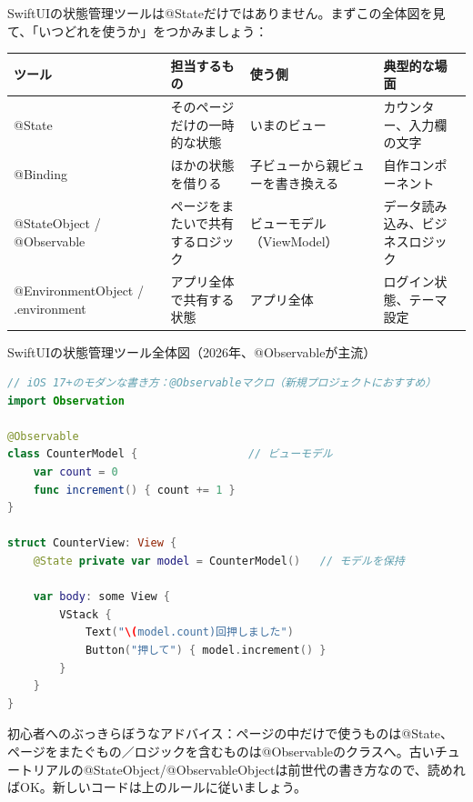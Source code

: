


SwiftUIの状態管理ツールは@Stateだけではありません。まずこの全体図を見て、「いつどれを使うか」をつかみましょう：

\begin{center}
\begin{tabularx}{\linewidth}{|X|X|X|X|}
\hline
\textbf{ツール} & \textbf{担当するもの} & \textbf{使う側} & \textbf{典型的な場面} \tabularnewline
\hline
@State & そのページだけの一時的な状態 & いまのビュー & カウンター、入力欄の文字 \tabularnewline
@Binding & ほかの状態を借りる & 子ビューから親ビューを書き換える & 自作コンポーネント \tabularnewline
@StateObject / @Observable & ページをまたいで共有するロジック & ビューモデル（ViewModel） & データ読み込み、ビジネスロジック \tabularnewline
@EnvironmentObject / .environment & アプリ全体で共有する状態 & アプリ全体 & ログイン状態、テーマ設定 \tabularnewline
\hline
\end{tabularx}
\end{center}

\begin{center}\small\color{gray}SwiftUIの状態管理ツール全体図（2026年、@Observableが主流）\end{center}

\begin{lstlisting}[language=Swift]
// iOS 17+のモダンな書き方：@Observableマクロ（新規プロジェクトにおすすめ）
import Observation

@Observable
class CounterModel {                 // ビューモデル
    var count = 0
    func increment() { count += 1 }
}

struct CounterView: View {
    @State private var model = CounterModel()   // モデルを保持

    var body: some View {
        VStack {
            Text("\(model.count)回押しました")
            Button("押して") { model.increment() }
        }
    }
}
\end{lstlisting}

初心者へのぶっきらぼうなアドバイス：ページの中だけで使うものは@State、ページをまたぐもの／ロジックを含むものは@Observableのクラスへ。古いチュートリアルの@StateObject/@ObservableObjectは前世代の書き方なので、読めればOK。新しいコードは上のルールに従いましょう。

